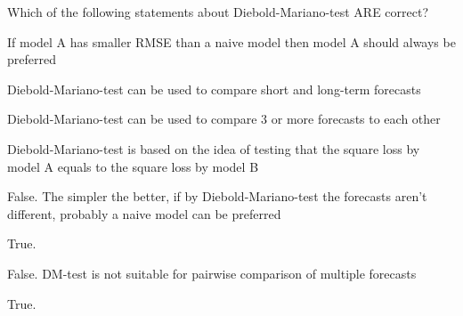 
\begin{question}
Which of the following statements about Diebold-Mariano-test ARE correct?
\begin{answerlist}
  \item If model A has smaller RMSE than a naive model then model A should always be preferred
  \item Diebold-Mariano-test can be used to compare short and long-term forecasts
  \item Diebold-Mariano-test can be used to compare 3 or more forecasts to each other
  \item Diebold-Mariano-test is based on the idea of testing that the square loss by model A equals to the square loss by model B
\end{answerlist}
\end{question}

\begin{solution}
\begin{answerlist}
  \item False. The simpler the better, if by Diebold-Mariano-test the forecasts aren't different, probably a naive model can be preferred
  \item True.
  \item False. DM-test is not suitable for pairwise comparison of multiple forecasts
  \item True.
\end{answerlist}
\end{solution}

